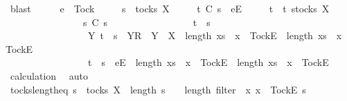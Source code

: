 \begin{isabellebody}
\ blast\isanewline
\ \ \isamarkupfalse%
\ \isamarkupfalse%
\ {\isachardoublequoteopen}e\ {\isasymnoteq}\ Tock\ {\isasymLongrightarrow}\isanewline
\ \ \ \ s\ {\isasymin}\ tocks\ X\ {\isasymLongrightarrow}\isanewline
\ \ \ \ t\ {\isasymlesssim}\isactrlsub C\ s\ {\isacharat}\ {\isacharbrackleft}{\isacharbrackleft}e{\isacharbrackright}\isactrlsub E{\isacharbrackright}\ {\isasymLongrightarrow}\isanewline
\ \ \ \ t\ {\isasymin}\ {\isacharbraceleft}t{\isachardot}\ {\isasymexists}s{\isacharprime}{\isasymin}tocks\ X{\isachardot}\isanewline
\ \ \ \ \ \ \ \ \ \ \ \ \ \ \ \ s{\isacharprime}\ {\isasymlesssim}\isactrlsub C\ s\ {\isasymand}\isanewline
\ \ \ \ \ \ \ \ \ \ \ \ \ \ \ \ {\isacharparenleft}t\ {\isacharequal}\ s{\isacharprime}\ {\isasymor}\isanewline
\ \ \ \ \ \ \ \ \ \ \ \ \ \ \ \ \ {\isacharparenleft}{\isasymexists}Y{\isachardot}\ t\ {\isacharequal}\ s{\isacharprime}\ {\isacharat}\ {\isacharbrackleft}{\isacharbrackleft}Y{\isacharbrackright}\isactrlsub R{\isacharbrackright}\ {\isasymand}\ Y\ {\isasymsubseteq}\ X\ {\isasymand}\ length\ {\isacharbrackleft}x{\isasymleftarrow}s{\isacharprime}\ {\isachardot}\ x\ {\isacharequal}\ {\isacharbrackleft}Tock{\isacharbrackright}\isactrlsub E{\isacharbrackright}\ {\isacharless}\ length\ {\isacharbrackleft}x{\isasymleftarrow}s\ {\isachardot}\ x\ {\isacharequal}\ {\isacharbrackleft}Tock{\isacharbrackright}\isactrlsub E{\isacharbrackright}{\isacharparenright}\ {\isasymor}\isanewline
\ \ \ \ \ \ \ \ \ \ \ \ \ \ \ \ \ t\ {\isacharequal}\ s{\isacharprime}\ {\isacharat}\ {\isacharbrackleft}{\isacharbrackleft}e{\isacharbrackright}\isactrlsub E{\isacharbrackright}\ {\isasymand}\ length\ {\isacharbrackleft}x{\isasymleftarrow}s{\isacharprime}\ {\isachardot}\ x\ {\isacharequal}\ {\isacharbrackleft}Tock{\isacharbrackright}\isactrlsub E{\isacharbrackright}\ {\isacharequal}\ length\ {\isacharbrackleft}x{\isasymleftarrow}s\ {\isachardot}\ x\ {\isacharequal}\ {\isacharbrackleft}Tock{\isacharbrackright}\isactrlsub E{\isacharbrackright}{\isacharparenright}{\isacharbraceright}{\isachardoublequoteclose}\isanewline
\ \ \ \ \isamarkupfalse%
\ calculation\ \isamarkupfalse%
\ auto\isanewline
{}\isamarkupfalse%
%
\endisatagproof
{\isafoldproof}%
%
\isadelimproof
\isanewline
%
\endisadelimproof
\isanewline
{}\isamarkupfalse%
\ tocks{\isacharunderscore}length{\isacharunderscore}eq{\isacharcolon}\ {\isachardoublequoteopen}s\ {\isasymin}\ tocks\ X\ {\isasymLongrightarrow}\ length\ s\ {\isacharequal}\ {}\ {\isacharasterisk}\ length\ {\isacharparenleft}filter\ {\isacharparenleft}{\isasymlambda}\ x{\isachardot}\ x\ {\isacharequal}\ {\isacharbrackleft}Tock{\isacharbrackright}\isactrlsub E{\isacharparenright}\ s{\isacharparenright}{\isachardoublequoteclose}\isanewline

\end{isabellebody}
